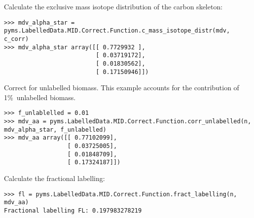 Calculate the exclusive mass isotope distribution of the carbon skeleton:

\begin{verbatim}
>>> mdv_alpha_star = pyms.LabelledData.MID.Correct.Function.c_mass_isotope_distr(mdv, c_corr)
>>> mdv_alpha_star array([[ 0.7729932 ],
                          [ 0.03719172],
                          [ 0.01830562],
                          [ 0.17150946]])
\end{verbatim}

Correct for unlabelled biomass. This example accounts for the contribution
of 1\%\ unlabelled biomass.

\begin{verbatim}
>>> f_unlablelled = 0.01 
>>> mdv_aa = pyms.LabelledData.MID.Correct.Function.corr_unlabelled(n, mdv_alpha_star, f_unlabelled)
>>> mdv_aa array([[ 0.77102099],
                  [ 0.03725005],
                  [ 0.01848709],
                  [ 0.17324187]])
\end{verbatim}

Calculate the fractional labelling:

\begin{verbatim}
>>> fl = pyms.LabelledData.MID.Correct.Function.fract_labelling(n, mdv_aa)
Fractional labelling FL: 0.197983278219
\end{verbatim}
